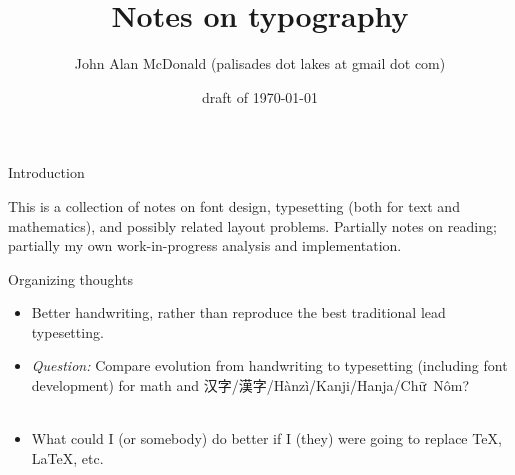 \documentclass[11pt]{PalisadesLakesBook}
\title{Notes on typography}
\author{John Alan McDonald 
(palisades dot lakes at gmail dot com)}
\date{draft of \today}
\begin{document}
\maketitle
{}
\def\sharedFolder{../../shared/}
\begin{plSection}{Introduction}

This is a collection of notes on font design,
typesetting (both for text and mathematics),
and possibly related layout problems. 
Partially notes on reading; 
partially my own work-in-progress analysis and implementation.
\begin{plSection}{Organizing thoughts}

\begin{itemize}

\item Better handwriting, rather than reproduce the best
traditional lead typesetting.

\item \emph{Question:} Compare evolution from handwriting to 
typesetting (including font development) for
math and 
汉字/\allowbreak 漢字/\allowbreak Hànzì/\allowbreak Kanji/\allowbreak Hanja/\allowbreak \mbox{Chữ Nôm}?\\
\\
 
\item What could I (or somebody) do better
if I (they) were going to replace \TeX, \LaTeX, etc.


\end{itemize}
\end{plSection}%
\end{plSection}%
\end{document}
